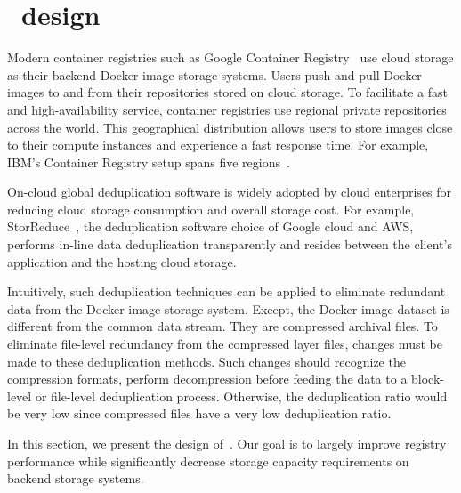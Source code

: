 \section{\sysname~design}
\label{sec:slimmer}

%



Modern container registries such as Google Container Registry~\cite{GoogleContainerRegistry} use cloud storage as their backend Docker image storage systems. 
Users push and pull Docker images to and from their repositories stored on cloud storage. 
To facilitate a fast and high-availability service, container registries use regional private repositories across the world.  
This geographical distribution allows users to store images close to their compute instances and experience a fast response time. 
For example, IBM's Container Registry setup spans five regions~\cite{dockerworkload}. 

On-cloud global deduplication software is widely adopted by cloud enterprises for reducing cloud storage consumption and overall storage cost. 
For example, StorReduce~\cite{storreduce_purestorage}, the deduplication software choice of Google cloud and AWS, 
performs in-line data deduplication transparently and resides between the client's application and the hosting cloud storage.

Intuitively, such deduplication techniques can be applied to eliminate redundant data from the Docker image storage system.  
Except, the Docker image dataset is different from the common data stream. 
They are compressed archival files.
To eliminate file-level redundancy from the compressed layer files, changes must be made to these deduplication methods. 
Such changes should recognize the compression formats, perform decompression before feeding the data to a block-level or file-level deduplication process. 
Otherwise, the deduplication ratio would be very low since compressed files have a very low deduplication ratio. 

In this section, we present the design of~\sysname.
Our goal is to largely improve registry performance while significantly decrease storage capacity requirements on backend storage systems.






